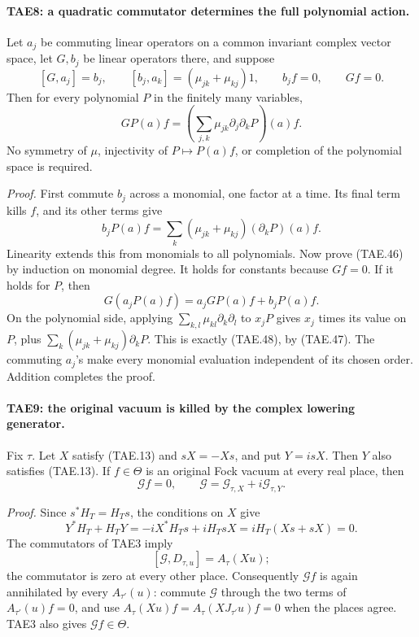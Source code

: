 \paragraph{TAE8: a quadratic commutator determines the full polynomial action.}
\label{claim:TAE8}
Let \(a_j\) be commuting linear operators on a common invariant
complex vector space, let \(G,b_j\) be linear operators there,
and suppose
\[
 [G,a_j]=b_j,\qquad
 [b_j,a_k]=(\mu_{jk}+\mu_{kj})1,\qquad
 b_jf=0,\qquad Gf=0 .
 \tag{TAE.45}
\]
Then for every polynomial \(P\) in the finitely many variables,
\[
 GP(a)f=
    \left(\sum_{j,k}\mu_{jk}\partial_j\partial_kP\right)(a)f .
 \tag{TAE.46}
\]
No symmetry of \(\mu\), injectivity of \(P\mapsto P(a)f\), or
completion of the polynomial space is required.

\emph{Proof.}
First commute \(b_j\) across a monomial, one factor at a time.
Its final term kills \(f\), and its other terms give
\[
 b_jP(a)f=\sum_k(\mu_{jk}+\mu_{kj})(\partial_kP)(a)f .
 \tag{TAE.47}
\]
Linearity extends this from monomials to all polynomials.
Now prove (TAE.46) by induction on monomial degree.
It holds for constants because \(Gf=0\).
If it holds for \(P\), then
\[
 G(a_jP(a)f)=a_jGP(a)f+b_jP(a)f.
 \tag{TAE.48}
\]
On the polynomial side, applying
\(\sum_{k,l}\mu_{kl}\partial_k\partial_l\) to \(x_jP\)
gives \(x_j\) times its value on \(P\), plus
\(\sum_k(\mu_{jk}+\mu_{kj})\partial_kP\).
This is exactly (TAE.48), by (TAE.47).
The commuting \(a_j\)'s make every monomial evaluation
independent of its chosen order.  Addition completes the proof.

\paragraph{TAE9: the original vacuum is killed by the complex lowering generator.}
\label{claim:TAE9}
Fix \(\tau\).  Let \(X\) satisfy (TAE.13) and
\(sX=-Xs\), and put \(Y=isX\).  Then \(Y\) also satisfies
(TAE.13).  If \(f\in\Theta\) is an original Fock vacuum at
every real place, then
\[
       \mathcal Gf=0,\qquad
       \mathcal G=\mathcal G_{\tau,X}
                           +i\mathcal G_{\tau,Y}.
 \tag{TAE.49}
\]

\emph{Proof.}
Since \(s^*H_T=H_Ts\), the conditions on \(X\) give
\[
 Y^*H_T+H_TY
   =-iX^*H_Ts+iH_TsX
   =iH_T(Xs+sX)=0.
 \tag{TAE.50}
\]
The commutators of TAE3 imply
\[
 [\mathcal G,D_{\tau,u}]=A_\tau(Xu);
 \tag{TAE.51}
\]
the commutator is zero at every other place.
Consequently \(\mathcal Gf\) is again annihilated by
every \(A_{\tau'}(u)\): commute \(\mathcal G\) through the
two terms of \(A_{\tau'}(u)f=0\), and use
\(A_\tau(Xu)f=A_\tau(XJ_{\tau'}u)f=0\) when the places agree.
TAE3 also gives \(\mathcal Gf\in\Theta\).

